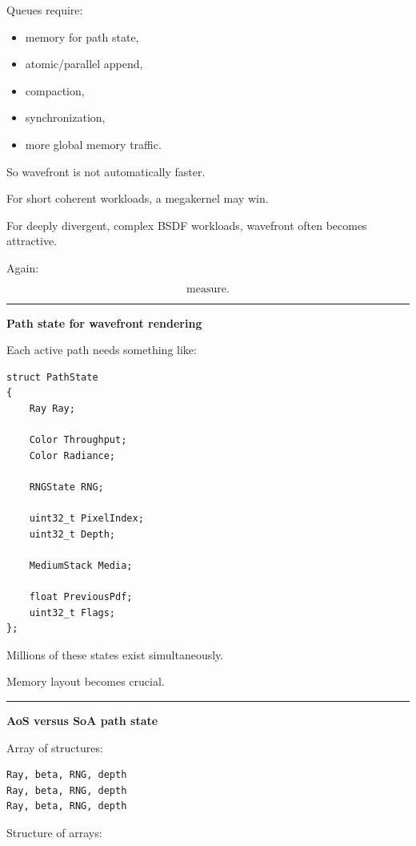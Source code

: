 Queues require:

\begin{itemize}
\tightlist
\item
  memory for path state,
\item
  atomic/parallel append,
\item
  compaction,
\item
  synchronization,
\item
  more global memory traffic.
\end{itemize}

So wavefront is not automatically faster.

For short coherent workloads, a megakernel may win.

For deeply divergent, complex BSDF workloads, wavefront often becomes attractive.

Again:

\[
\boxed{\text{measure}.}
\]

\begin{center}\rule{0.5\linewidth}{0.5pt}\end{center}

\textbf{Path state for wavefront rendering}

Each active path needs something like:

\begin{verbatim}
struct PathState
{
    Ray Ray;

    Color Throughput;
    Color Radiance;

    RNGState RNG;

    uint32_t PixelIndex;
    uint32_t Depth;

    MediumStack Media;

    float PreviousPdf;
    uint32_t Flags;
};
\end{verbatim}

Millions of these states exist simultaneously.

Memory layout becomes crucial.

\begin{center}\rule{0.5\linewidth}{0.5pt}\end{center}

\textbf{AoS versus SoA path state}

Array of structures:

\begin{verbatim}
Ray, beta, RNG, depth
Ray, beta, RNG, depth
Ray, beta, RNG, depth
\end{verbatim}

Structure of arrays:

